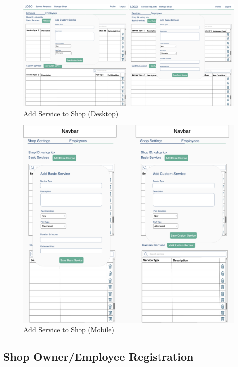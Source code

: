 \documentclass[12pt, titlepage]{article}
\begin{document}
\begin{figure}[H]
	\centering
	\includegraphics[width=\textwidth]{mockups/Service Form (Shop Settings) (Desktop).png}
	\caption{Add Service to Shop (Desktop)}
\end{figure}

\begin{figure}[H]
	\centering
	\includegraphics[width=\textwidth]{mockups/Service Form (Shop Settings) (Mobile).png}
	\caption{Add Service to Shop (Mobile)}
\end{figure}

\subsection{Shop Owner/Employee Registration}
\end{document}
